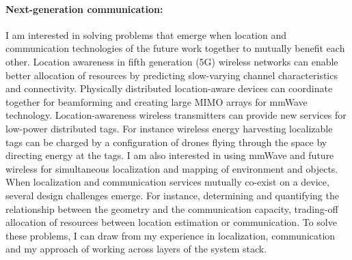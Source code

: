 \documentclass[10pt]{article}
\begin{document}
\paragraph{Next-generation communication: }
I am interested in solving problems that emerge when location and communication technologies of the future work together to mutually benefit each other. 
Location awareness in fifth generation (5G) wireless networks can enable better allocation of resources by predicting slow-varying channel characteristics and connectivity. Physically distributed location-aware devices can coordinate together for beamforming and creating large MIMO arrays for mmWave technology. Location-awareness wireless transmitters can provide 
new services for low-power distributed tags. %
For instance wireless energy harvesting localizable tags can be charged by a configuration of drones flying through the space by directing energy at the tags. I am also interested in using mmWave and future wireless for simultaneous localization and mapping of environment and objects. When localization and communication services mutually co-exist on a device, several design challenges emerge. For instance, determining and quantifying the relationship between the geometry and the communication capacity, trading-off allocation of resources between location estimation or communication. To solve these problems, I can draw from my experience in localization, communication and my approach of working across layers of the system stack. 



\end{document}
